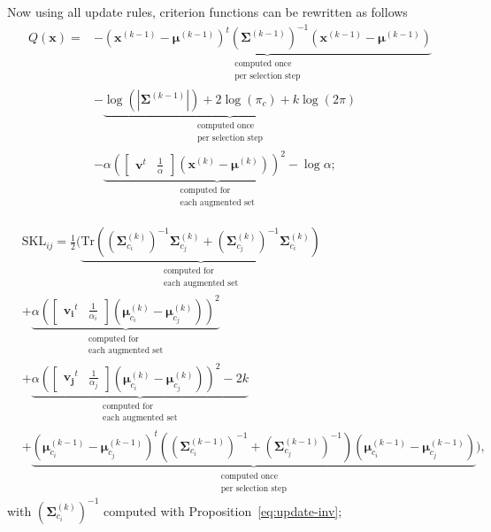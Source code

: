 \documentclass[journal,peerreview,onecolumn]{IEEEtran}
\begin{document}
        Now using all update rules, criterion functions can be rewritten as follows
        \begin{align}
        \label{eq:q-update}
            Q(\mathbf{x}) = &- \underbrace{(\mathbf{x}^{(k-1)} - \boldsymbol{\mu}^{(k-1)})^t (\boldsymbol{\Sigma}^{(k-1)})^{-1} (\mathbf{x}^{(k-1)} - \boldsymbol{\mu}^{(k-1)})}_{\substack{\text{computed once}\\ \text{per selection step}}} \nonumber \\
            &- \underbrace{\log \left(|\boldsymbol{\Sigma}^{(k-1)}|\right) + 2 \log (\pi_c) + k \log(2 \pi)}_{\substack{\text{computed once}\\ \text{per selection step}}} \nonumber \\
            &- \underbrace{\alpha \left( \left[\begin{array}{cc} \mathbf{v}^t & \frac{1}{\alpha} \end{array}\right] (\mathbf{x}^{(k)} - \boldsymbol{\mu}^{(k)}) \right)^2 - \log \alpha}_{\substack{\text{computed for} \\ \text{each augmented set}}};
        \end{align}

        \begin{align}
        \label{eq:skl-update}
            &\text{SKL}_{ij} = \frac{1}{2} \biggl( \underbrace{\text{Tr} \left((\boldsymbol{\Sigma}_{c_i}^{(k)})^{-1} \boldsymbol{\Sigma}_{c_j}^{(k)} + (\boldsymbol{\Sigma}_{c_j}^{(k)})^{-1} \boldsymbol{\Sigma}_{c_i}^{(k)}\right)}_{\substack{\text{computed for} \\ \text{each augmented set}}} \nonumber \\
            &+ \underbrace{\alpha ( \left[\begin{array}{cc} \mathbf{v_i}^t & \frac{1}{\alpha_i} \end{array}\right] (\boldsymbol{\mu}_{c_i}^{(k)} - \boldsymbol{\mu}_{c_j}^{(k)}) )^2}_{\substack{\text{computed for} \\ \text{each augmented set}}} \nonumber \\
            &+ \underbrace{\alpha ( \left[\begin{array}{cc} \mathbf{v_j}^t & \frac{1}{\alpha_j} \end{array}\right] (\boldsymbol{\mu}_{c_i}^{(k)} - \boldsymbol{\mu}_{c_j}^{(k)}) )^2 - 2k}_{\substack{\text{computed for} \\ \text{each augmented set}}} \nonumber \\
            &+ \underbrace{(\boldsymbol{\mu}_{c_i}^{(k-1)} - \boldsymbol{\mu}_{c_j}^{(k-1)})^t ((\boldsymbol{\Sigma}_{c_i}^{(k-1)})^{-1} + (\boldsymbol{\Sigma}_{c_j}^{(k-1)})^{-1}) (\boldsymbol{\mu}_{c_i}^{(k-1)} - \boldsymbol{\mu}_{c_j}^{(k-1)})}_{\substack{\text{computed once}\\ \text{per selection step}}} \biggr),
        \end{align}
        with $(\boldsymbol{\Sigma}_{c_i}^{(k)})^{-1}$ computed with Proposition~\ref{eq:update-inv};
\end{document}
